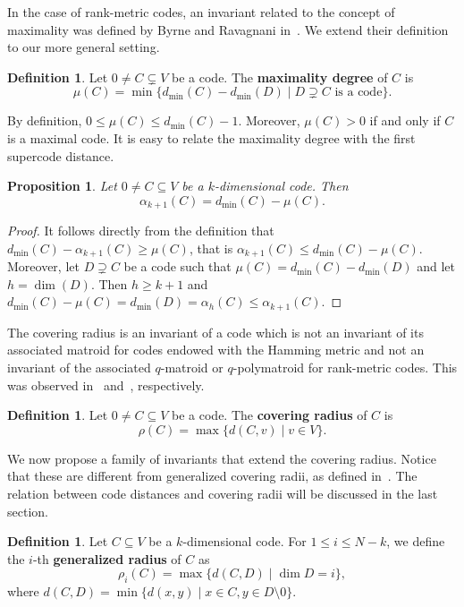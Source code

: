 \documentclass[12pt]{amsart}
\numberwithin{equation}{section}
\newtheorem{proposition}[theorem]{Proposition}
\theoremstyle{definition}
\newtheorem{definition}[theorem]{Definition}
\begin{document}
In the case of rank-metric codes, an invariant related to the concept of maximality was defined by Byrne and Ravagnani in~\cite[Definition~2.2]{BR17}. We extend their definition to our more general setting.

\begin{definition}
Let $0\neq C \subsetneq V$ be a code. The {\bf maximality degree} of $C$ is 
$$\mu(C)=\min\{d_{\min}(C)-d_{\min}(D)\mid D\supsetneq C \mbox{ is a code}\}.$$
\end{definition}

By definition, $0\leq \mu(C)\leq d_{\min}(C)-1$. Moreover, $\mu(C)>0$ if and only if $C$ is a maximal code.
It is easy to relate the maximality degree with the first supercode distance.

\begin{proposition}\label{prop:mu}
Let $0\neq C\subseteq V$ be a $k$-dimensional code.
Then $$\alpha_{k+1}(C)=d_{\min}(C)-\mu(C).$$
\end{proposition}

\begin{proof}
It follows directly from the definition that $d_{\min}(C)-\alpha_{k+1}(C)\geq\mu(C)$, that is $\alpha_{k+1}(C)\leq d_{\min}(C)-\mu(C)$. Moreover, let $D\supsetneq C$ be a code such that $\mu(C)=d_{\min}(C)-d_{\min}(D)$ and let $h=\dim(D)$. Then $h\geq k+1$ and $d_{\min}(C)-\mu(C)=d_{\min}(D)=\alpha_h(C)\leq\alpha_{k+1}(C)$.
\end{proof}

The covering radius is an invariant of a code which is not an invariant of its associated matroid for codes endowed with the Hamming metric and not an invariant of the associated $q$-matroid or $q$-polymatroid for rank-metric codes. This was observed in~\cite{BR05} and~\cite[Example~6.8]{GJLR20}, respectively.

\begin{definition}
Let $0\neq C\subseteq V$ be a code. The {\bf covering radius} of $C$ is $$\rho(C)=\max\{d(C,v)\mid v\in V\}.$$
\end{definition}

We now propose a family of invariants that extend the covering radius. Notice that these are different from generalized covering radii, as defined in~\cite{EFS21}. The relation between code distances and covering radii will be discussed in the last section.

\begin{definition}
Let $C\subseteq V$ be a $k$-dimensional code. For $1\leq i\leq N-k$, we define the $i$-th {\bf generalized radius} of $C$ as
$$\rho_i(C)=\max\{d(C,D)\mid\dim D=i\},$$ where $d(C,D)=\min\{d(x,y)\mid x\in C, y\in D\setminus 0\}$.
\end{definition}
\end{document}
